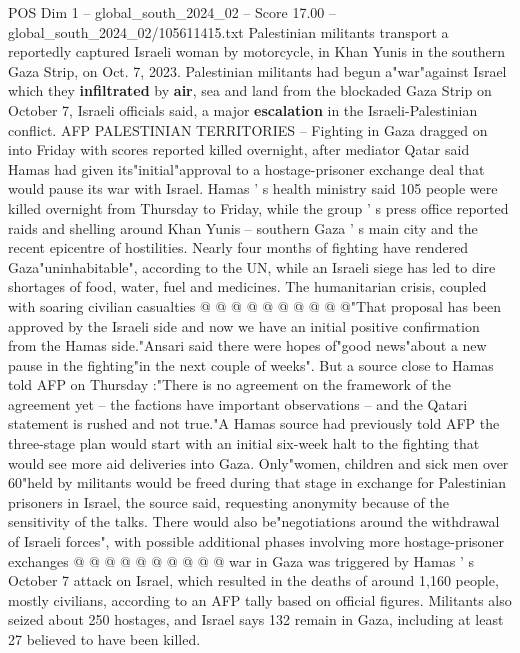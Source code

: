 \begin{textsample}{POS Dim 1 – global\_south\_2024\_02 – Score 17.00 – global\_south\_2024\_02/105611415.txt}  \label{ex:f1_pos_208}
Palestinian militants transport a reportedly captured Israeli woman by motorcycle, in Khan Yunis in the southern Gaza Strip, on Oct. 7, 2023.
Palestinian militants had begun a"war"against Israel which they \textbf{infiltrated} by \textbf{air}, sea and land from the blockaded Gaza Strip on October 7, Israeli officials said, a major \textbf{escalation} in the Israeli-Palestinian conflict.
AFP PALESTINIAN TERRITORIES -- Fighting in Gaza dragged on into Friday with scores reported killed overnight, after mediator Qatar said Hamas had given its"initial"approval to a hostage-prisoner exchange deal that would pause its war with Israel.
Hamas ' s health ministry said 105 people were killed overnight from Thursday to Friday, while the group ' s press office reported raids and shelling around Khan Yunis -- southern Gaza ' s main city and the recent epicentre of hostilities.
Nearly four months of fighting have rendered Gaza"uninhabitable", according to the UN, while an Israeli siege has led to dire shortages of food, water, fuel and medicines.
The humanitarian crisis, coupled with soaring civilian casualties @ @ @ @ @ @ @ @ @ @"That proposal has been approved by the Israeli side and now we have an initial positive confirmation from the Hamas side."Ansari said there were hopes of"good news"about a new pause in the fighting"in the next couple of weeks".
But a source close to Hamas told AFP on Thursday :"There is no agreement on the framework of the agreement yet -- the factions have important observations -- and the Qatari statement is rushed and not true."A Hamas source had previously told AFP the three-stage plan would start with an initial six-week halt to the fighting that would see more aid deliveries into Gaza.
Only"women, children and sick men over 60"held by militants would be freed during that stage in exchange for Palestinian prisoners in Israel, the source said, requesting anonymity because of the sensitivity of the talks.
There would also be"negotiations around the withdrawal of Israeli forces", with possible additional phases involving more hostage-prisoner exchanges @ @ @ @ @ @ @ @ @ @ war in Gaza was triggered by Hamas ' s October 7 attack on Israel, which resulted in the deaths of around 1,160 people, mostly civilians, according to an AFP tally based on official figures.
Militants also seized about 250 hostages, and Israel says 132 remain in Gaza, including at least 27 believed to have been killed.

\end{textsample}
